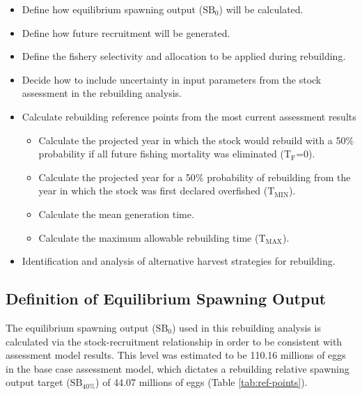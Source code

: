 \documentclass[11pt,
  english,
  a4paper,
]{article}
\begin{document}
\begin{itemize}
    \item Define how equilibrium spawning output ($\text{SB}_0$) will be calculated. 
    \item Define how future recruitment will be generated. 
    \item Define the fishery selectivity and allocation to be applied during rebuilding. 
    \item Decide how to include uncertainty in input parameters from the stock assessment in the rebuilding analysis. 
    \item Calculate rebuilding reference points from the most current assessment results 
    \begin{itemize}
        \item Calculate the projected year in which the stock would rebuild with a 50$\%$ probability if all future fishing mortality was eliminated ($\text{T}_\text{F}$=0).
        \item  Calculate the projected year for a 50$\%$ probability of rebuilding from the year in which the stock was first declared overfished ($\text{T}_\text{MIN}$). 
        \item Calculate the mean generation time. 
        \item Calculate the maximum allowable rebuilding time ($\text{T}_\text{MAX}$). 
    \end{itemize}
    \item Identification and analysis of alternative harvest strategies for rebuilding. 
\end{itemize}


\hypertarget{definition-of-equilibrium-spawning-output}{%
\subsection{Definition of Equilibrium Spawning Output}\label{definition-of-equilibrium-spawning-output}}

\leavevmode\tagmcend\tagstructend


The equilibrium spawning output ({\(\text{SB}_0\)\leavevmode\tagmcend\tagstructend}) used in this rebuilding analysis is calculated via the stock-recruitment relationship in order to be consistent with assessment model results. This level was estimated to be 110.16 millions of eggs in the base case assessment model, which dictates a rebuilding relative spawning output target ({\(\text{SB}_{40\%}\)\leavevmode\tagmcend\tagstructend}) of 44.07 millions of eggs (Table \ref{tab:ref-points}).
\end{document}
